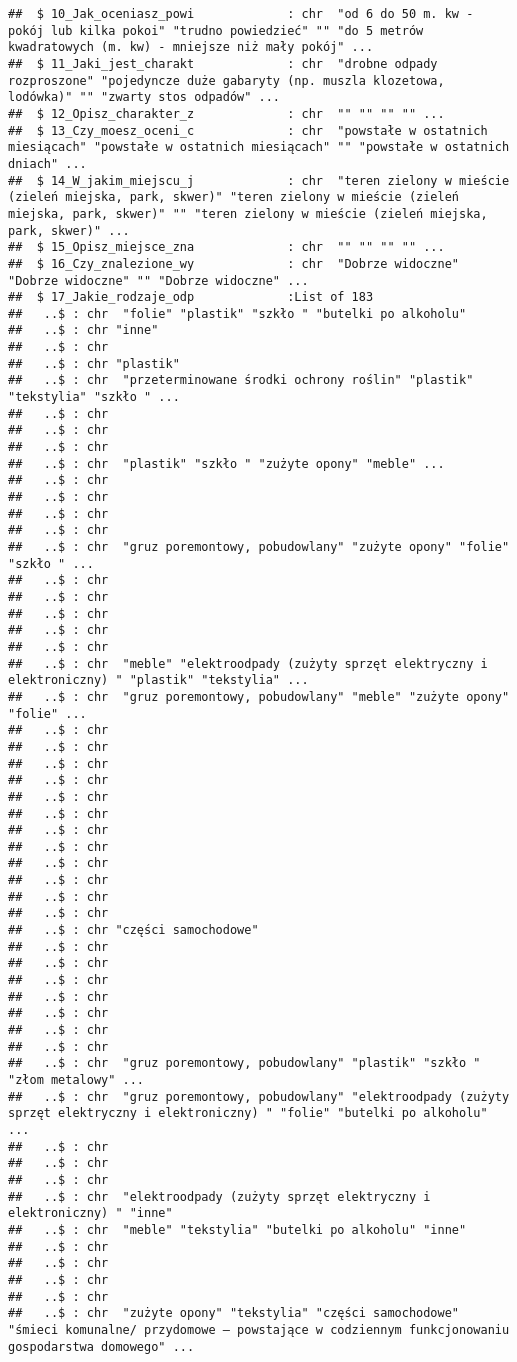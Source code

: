 \documentclass[
]{article}
\begin{document}
\begin{verbatim}
##  $ 10_Jak_oceniasz_powi             : chr  "od 6 do 50 m. kw - pokój lub kilka pokoi" "trudno powiedzieć" "" "do 5 metrów kwadratowych (m. kw) - mniejsze niż mały pokój" ...
##  $ 11_Jaki_jest_charakt             : chr  "drobne odpady rozproszone" "pojedyncze duże gabaryty (np. muszla klozetowa, lodówka)" "" "zwarty stos odpadów" ...
##  $ 12_Opisz_charakter_z             : chr  "" "" "" "" ...
##  $ 13_Czy_moesz_oceni_c             : chr  "powstałe w ostatnich miesiącach" "powstałe w ostatnich miesiącach" "" "powstałe w ostatnich dniach" ...
##  $ 14_W_jakim_miejscu_j             : chr  "teren zielony w mieście (zieleń miejska, park, skwer)" "teren zielony w mieście (zieleń miejska, park, skwer)" "" "teren zielony w mieście (zieleń miejska, park, skwer)" ...
##  $ 15_Opisz_miejsce_zna             : chr  "" "" "" "" ...
##  $ 16_Czy_znalezione_wy             : chr  "Dobrze widoczne" "Dobrze widoczne" "" "Dobrze widoczne" ...
##  $ 17_Jakie_rodzaje_odp             :List of 183
##   ..$ : chr  "folie" "plastik" "szkło " "butelki po alkoholu"
##   ..$ : chr "inne"
##   ..$ : chr 
##   ..$ : chr "plastik"
##   ..$ : chr  "przeterminowane środki ochrony roślin" "plastik" "tekstylia" "szkło " ...
##   ..$ : chr 
##   ..$ : chr 
##   ..$ : chr 
##   ..$ : chr  "plastik" "szkło " "zużyte opony" "meble" ...
##   ..$ : chr 
##   ..$ : chr 
##   ..$ : chr 
##   ..$ : chr 
##   ..$ : chr  "gruz poremontowy, pobudowlany" "zużyte opony" "folie" "szkło " ...
##   ..$ : chr 
##   ..$ : chr 
##   ..$ : chr 
##   ..$ : chr 
##   ..$ : chr 
##   ..$ : chr  "meble" "elektroodpady (zużyty sprzęt elektryczny i elektroniczny) " "plastik" "tekstylia" ...
##   ..$ : chr  "gruz poremontowy, pobudowlany" "meble" "zużyte opony" "folie" ...
##   ..$ : chr 
##   ..$ : chr 
##   ..$ : chr 
##   ..$ : chr 
##   ..$ : chr 
##   ..$ : chr 
##   ..$ : chr 
##   ..$ : chr 
##   ..$ : chr 
##   ..$ : chr 
##   ..$ : chr 
##   ..$ : chr 
##   ..$ : chr "części samochodowe"
##   ..$ : chr 
##   ..$ : chr 
##   ..$ : chr 
##   ..$ : chr 
##   ..$ : chr 
##   ..$ : chr 
##   ..$ : chr 
##   ..$ : chr  "gruz poremontowy, pobudowlany" "plastik" "szkło " "złom metalowy" ...
##   ..$ : chr  "gruz poremontowy, pobudowlany" "elektroodpady (zużyty sprzęt elektryczny i elektroniczny) " "folie" "butelki po alkoholu" ...
##   ..$ : chr 
##   ..$ : chr 
##   ..$ : chr 
##   ..$ : chr  "elektroodpady (zużyty sprzęt elektryczny i elektroniczny) " "inne"
##   ..$ : chr  "meble" "tekstylia" "butelki po alkoholu" "inne"
##   ..$ : chr 
##   ..$ : chr 
##   ..$ : chr 
##   ..$ : chr 
##   ..$ : chr  "zużyte opony" "tekstylia" "części samochodowe" "śmieci komunalne/ przydomowe – powstające w codziennym funkcjonowaniu gospodarstwa domowego" ...

\end{verbatim}
\end{document}
